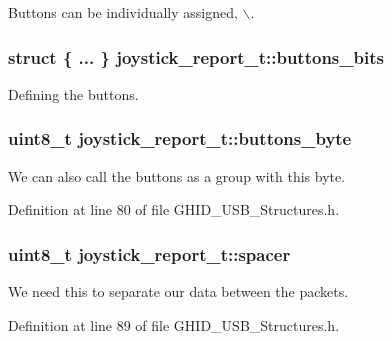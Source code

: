 \-Buttons can be individually assigned, $\backslash$. 

\hypertarget{structjoystick__report__t_a1bcf6f6b1266188a7075f04452dcd3e9}{
\subsubsection[{buttons\-\_\-bits}]{\setlength{\rightskip}{0pt plus 5cm}struct \{ ... \}  {\bf joystick\-\_\-report\-\_\-t\-::buttons\-\_\-bits}}}\label{structjoystick__report__t_a1bcf6f6b1266188a7075f04452dcd3e9}


\-Defining the buttons. 

\hypertarget{structjoystick__report__t_a1b9fb1806c80f76292cba7c719ac6c6c}{
\subsubsection[{buttons\-\_\-byte}]{\setlength{\rightskip}{0pt plus 5cm}uint8\-\_\-t {\bf joystick\-\_\-report\-\_\-t\-::buttons\-\_\-byte}}}\label{structjoystick__report__t_a1b9fb1806c80f76292cba7c719ac6c6c}


\-We can also call the buttons as a group with this byte. 



\-Definition at line 80 of file \-G\-H\-I\-D\-\_\-\-U\-S\-B\-\_\-\-Structures.\-h.

\hypertarget{structjoystick__report__t_a4b7eb53cb199dc64ceea758f0baacbcc}{
\subsubsection[{spacer}]{\setlength{\rightskip}{0pt plus 5cm}uint8\-\_\-t {\bf joystick\-\_\-report\-\_\-t\-::spacer}}}\label{structjoystick__report__t_a4b7eb53cb199dc64ceea758f0baacbcc}


\-We need this to separate our data between the packets. 



\-Definition at line 89 of file \-G\-H\-I\-D\-\_\-\-U\-S\-B\-\_\-\-Structures.\-h.

